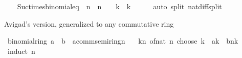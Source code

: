 \begin{isabellebody}
%
\isadelimproof
\ \ %
\endisadelimproof
%
\isatagproof
{}\isamarkupfalse%
\ Suc{\isacharunderscore}{\kern0pt}times{\isacharunderscore}{\kern0pt}binomial{\isacharunderscore}{\kern0pt}eq\ {\isacharbrackleft}{\kern0pt}\ n\ {\isacharequal}{\kern0pt}\ {\isachardoublequoteopen}n\ {\isacharminus}{\kern0pt}\ {}{\isachardoublequoteclose}\ \ k\ {\isacharequal}{\kern0pt}\ {\isachardoublequoteopen}k\ {\isacharminus}{\kern0pt}\ {}{\isachardoublequoteclose}{\isacharbrackright}{\kern0pt}\isanewline
\ \ \isamarkupfalse%
\ {\isacharparenleft}{\kern0pt}auto\ split{\isacharcolon}{\kern0pt}\ nat{\isacharunderscore}{\kern0pt}diff{\isacharunderscore}{\kern0pt}split{\isacharparenright}{\kern0pt}%
\endisatagproof
{\isafoldproof}%
%
\isadelimproof
%
\endisadelimproof
%
\isadelimdocument
%
\endisadelimdocument
%
\isatagdocument
%
\isamarkuptrue%
%
\endisatagdocument
{\isafolddocument}%
%
\isadelimdocument
%
\endisadelimdocument
%
\begin{isamarkuptext}%
Avigad's version, generalized to any commutative ring%
\end{isamarkuptext}\isamarkuptrue%
\isamarkupfalse%
\ binomial{\isacharunderscore}{\kern0pt}ring{\isacharcolon}{\kern0pt}\ {\isachardoublequoteopen}{\isacharparenleft}{\kern0pt}a\ {\isacharplus}{\kern0pt}\ b\ {\isacharcolon}{\kern0pt}{\isacharcolon}{\kern0pt}\ {\isacharprime}{\kern0pt}a{\isacharcolon}{\kern0pt}{\isacharcolon}{\kern0pt}comm{\isacharunderscore}{\kern0pt}semiring{\isacharunderscore}{\kern0pt}{}{\isacharparenright}{\kern0pt}{\isacharcircum}{\kern0pt}n\ {\isacharequal}{\kern0pt}\isanewline
\ \ {\isacharparenleft}{\kern0pt}{\isasymSum}k{\isasymle}n{\isachardot}{\kern0pt}\ {\isacharparenleft}{\kern0pt}of{\isacharunderscore}{\kern0pt}nat\ {\isacharparenleft}{\kern0pt}n\ choose\ k{\isacharparenright}{\kern0pt}{\isacharparenright}{\kern0pt}\ {\isacharasterisk}{\kern0pt}\ a{\isacharcircum}{\kern0pt}k\ {\isacharasterisk}{\kern0pt}\ b{\isacharcircum}{\kern0pt}{\isacharparenleft}{\kern0pt}n{\isacharminus}{\kern0pt}k{\isacharparenright}{\kern0pt}{\isacharparenright}{\kern0pt}{\isachardoublequoteclose}\isanewline
%
\isadelimproof
%
\endisadelimproof
%
\isatagproof
{}\isamarkupfalse%
\ {\isacharparenleft}{\kern0pt}induct\ n{\isacharparenright}{\kern0pt}\isanewline
\ \ \isamarkupfalse%
\ {}\isanewline
\ \ \isamarkupfalse%
\ \isamarkupfalse%

\end{isabellebody}
